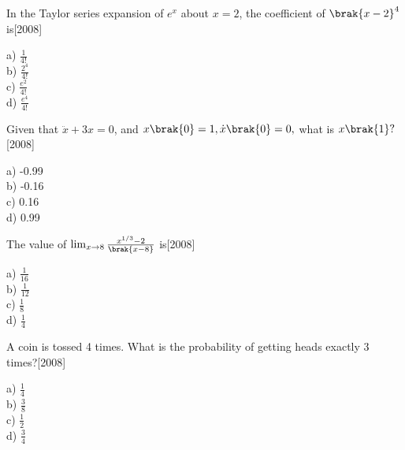 \iffalse
\author{EE24BTECH11062}
\section{me}
\chapter{2008}
\fi

   
\item In the Taylor series expansion of $e^x$ about $x=2$, the coefficient of $\brak{x-2}^4$ is\hfill{[2008]}
\begin{multicols}{4}
    a) $\frac{1}{4!}$\\
    b) $\frac{2^4}{4!}$\\
    c) $\frac{e^2}{4!}$\\
    d)  $\frac{e^4}{4!}$
\end{multicols}
 \item Given that $\ddot{x}+3x=0$, and $x\brak{0}=1,\dot{x}\brak{0}=0,
$ what is $x\brak{1}?$\hfill{[2008]}

 \begin{multicols}{4}
     a) -0.99\\
     b) -0.16\\
     c) 0.16\\
     d) 0.99
 \end{multicols}
 
 \item The value of $\lim_{x \to 8} \frac{x^{1/3}-2}{\brak{x-8}}$ is\hfill{[2008]}
 \begin{multicols}{4}
    a) $\frac{1}{16}$\\
    b) $\frac{1}{12}$\\
    c)  $\frac{1}{8}$\\
    d)  $\frac{1}{4}$
 \end{multicols}
 
\item A coin is tossed 4 times. What is the probability of getting heads exactly 3 times?\hfill{[2008]}
\begin{multicols}{4}
    a) $\frac{1}{4}$\\
    b) $\frac{3}{8}$\\
    c)  $\frac{1}{2}$\\
    d)  $\frac{3}{4}$
\end{multicols}


